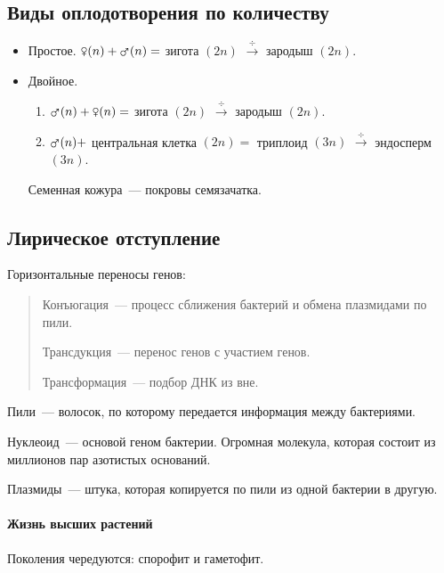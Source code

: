 \documentclass[12pt]{article}
\begin{document}
	\subsection{Виды оплодотворения по количеству}
	\begin{itemize}
		\item Простое. $\venus (n) + \mars (n) =$ зигота $(2n)$ $\xrightarrow{\div}$ зародыш $(2n)$.
		\item Двойное.
		\begin{enumerate}
			\item $\mars (n) + \venus (n) =$ зигота $(2n)$ $\xrightarrow{\div}$ зародыш $(2n)$.
			\item $\mars (n) +$ центральная клетка $(2n) =$ триплоид $(3n)$ $\xrightarrow{\div}$ эндосперм $(3n)$.
		\end{enumerate}
		Семенная кожура~--- покровы семязачатка.
	\end{itemize}
	\subsection{Лирическое отступление}
	Горизонтальные переносы генов:
	\begin{quote}
		\begin{definition}
			Конъюгация~--- процесс сближения бактерий и обмена плазмидами по пили.
		\end{definition}
		\begin{definition}
			Трансдукция~--- перенос генов с участием генов.
		\end{definition}
		\begin{definition}
			Трансформация~--- подбор ДНК из вне.
		\end{definition}
	\end{quote}
	\begin{definition}
		Пили~--- волосок, по которому передается информация между бактериями.
	\end{definition}
	\begin{definition}
		Нуклеоид~--- основой геном бактерии. Огромная молекула, которая состоит из миллионов пар азотистых оснований.
	\end{definition}
	\begin{definition}
		Плазмиды~--- штука, которая копируется по пили из одной бактерии в другую.
	\end{definition}
	\paragraph{Жизнь высших растений} Поколения чередуются: спорофит и гаметофит.
\end{document}

